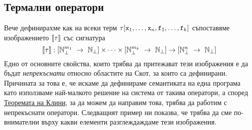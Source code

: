\subsection{Термални оператори}

Вече дефинирахме как на всеки терм $\tau[\texttt{x}_1,\dots,\texttt{x}_n,\texttt{f}_1,\dots,\texttt{f}_k]$
съпоставяме изображението $\llbracket{\tau}\rrbracket$ със сигнатура
\[\llbracket{\tau}\rrbracket:[\mathbb{N}^{m_1}_\bot~\to~\mathbb{N}_\bot]\times\cdots\times[\mathbb{N}^{m_k}_\bot~\to~\mathbb{N}_\bot] \to [\mathbb{N}^n_\bot~\to~\mathbb{N}_\bot]\]
Едно от основните свойства, които трябва да притежават тези изображения е да бъдат {\em непрекъснати} относно областите на Скот,
за които са дефинирани.
Причината за това е, че искаме да дефинираме семантиката на една програма като използваме най-малкото решение 
на система от такива оператори, а според \hyperref[th:knaster-tarski]{Теоремата на Клини}, за да можем да направим това, трябва да работим
с непрекъснати оператори. Следващият пример ни показва, че трябва да сме по-внимателни върху какви елементи разглеждаждаме тези изображения.

